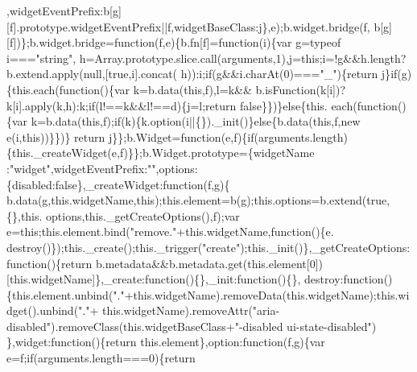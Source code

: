 \begin{DoxyCode}
      ,widgetEventPrefix:b[g][f].prototype.widgetEventPrefix||f,widgetBaseClass:j\},e);b.widget.bridge(f,
      b[g][f])\};b.widget.bridge=\textcolor{keyword}{function}(f,e)\{b.fn[f]=\textcolor{keyword}{function}(i)\{var g=typeof i===\textcolor{stringliteral}{"string"},
      h=Array.prototype.slice.call(arguments,1),j=\textcolor{keyword}{this};i=!g&&h.length?b.extend.apply(null,[\textcolor{keyword}{true},i].concat(
      h)):i;\textcolor{keywordflow}{if}(g&&i.charAt(0)===\textcolor{stringliteral}{"\_"})\{\textcolor{keywordflow}{return} j\}\textcolor{keywordflow}{if}(g)\{this.each(\textcolor{keyword}{function}()\{var k=b.data(\textcolor{keyword}{this},f),l=k&&
      b.isFunction(k[i])?k[i].apply(k,h):k;\textcolor{keywordflow}{if}(l!==k&&l!==d)\{j=l;\textcolor{keywordflow}{return} \textcolor{keyword}{false}\}\})\}\textcolor{keywordflow}{else}\{this.
      each(\textcolor{keyword}{function}()\{var k=b.data(\textcolor{keyword}{this},f);\textcolor{keywordflow}{if}(k)\{k.option(i||\{\}).\_init()\}\textcolor{keywordflow}{else}\{b.data(\textcolor{keyword}{this},f,\textcolor{keyword}{new} e(i,\textcolor{keyword}{this}))\}\})\}\textcolor{keywordflow}{
      return} j\}\};b.Widget=\textcolor{keyword}{function}(e,f)\{\textcolor{keywordflow}{if}(arguments.length)\{this.\_createWidget(e,f)\}\};b.Widget.prototype=\{widgetName
      :\textcolor{stringliteral}{"widget"},widgetEventPrefix:\textcolor{stringliteral}{""},options:\{disabled:\textcolor{keyword}{false}\},\_createWidget:\textcolor{keyword}{function}(f,g)\{
      b.data(g,this.widgetName,\textcolor{keyword}{this});this.element=b(g);this.options=b.extend(\textcolor{keyword}{true},\{\},this.
      options,this.\_getCreateOptions(),f);var e=\textcolor{keyword}{this};this.element.bind(\textcolor{stringliteral}{"remove."}+this.widgetName,\textcolor{keyword}{function}()\{e.
      destroy()\});this.\_create();this.\_trigger(\textcolor{stringliteral}{"create"});this.\_init()\},\_getCreateOptions:\textcolor{keyword}{function}()\{\textcolor{keywordflow}{return} 
      b.metadata&&b.metadata.get(this.element[0])[this.widgetName]\},\_create:\textcolor{keyword}{function}()\{\},\_init:\textcolor{keyword}{function}()\{\},
      destroy:\textcolor{keyword}{function}()\{this.element.unbind(\textcolor{stringliteral}{"."}+this.widgetName).removeData(this.widgetName);this.widget().unbind(\textcolor{stringliteral}{"."}+
      this.widgetName).removeAttr(\textcolor{stringliteral}{"aria-disabled"}).removeClass(this.widgetBaseClass+\textcolor{stringliteral}{"-disabled ui-state-disabled"})
      \},widget:\textcolor{keyword}{function}()\{\textcolor{keywordflow}{return} this.element\},option:\textcolor{keyword}{function}(f,g)\{var e=f;\textcolor{keywordflow}{if}(arguments.length===0)\{\textcolor{keywordflow}{return} 

\end{DoxyCode}

